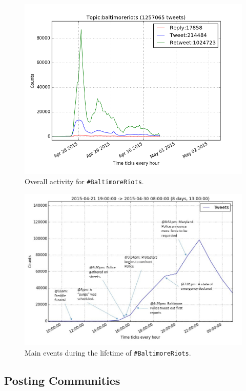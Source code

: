 \begin{figure}[htb]
\centering
\includegraphics[width=\columnwidth]{images/overallbaltimoreactivity.png}
\caption{Overall activity for {\texttt{\#BaltimoreRiots}}.}
\label{fig:overallbaltimoreactivity}
\end{figure}

\begin{figure}[htb]
\centering
\includegraphics[width=\columnwidth]{images/mainevents.png}
\caption{Main events during the lifetime of {\texttt{\#BaltimoreRiots}}.}
\label{fig:mainevents}
\end{figure}

\subsection{Posting Communities}

